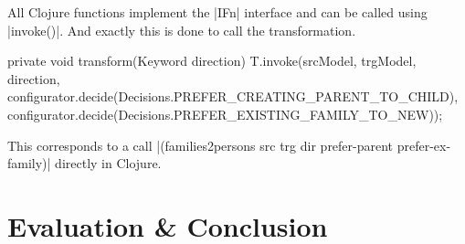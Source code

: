 \documentclass[a4paper]{article}
\newcommand{\code}{\clojureinline}
\begin{document}
All Clojure functions implement the \code|IFn| interface and can be called
using \code|invoke()|.  And exactly this is done to call the transformation.

\begin{javacode}
    private void transform(Keyword direction) {
        T.invoke(srcModel, trgModel, direction,
                configurator.decide(Decisions.PREFER_CREATING_PARENT_TO_CHILD),
                configurator.decide(Decisions.PREFER_EXISTING_FAMILY_TO_NEW));
    }
\end{javacode}

This corresponds to a call
\code|(families2persons src trg dir prefer-parent prefer-ex-family)| directly
in Clojure.

\section{Evaluation \& Conclusion}
\label{sec:evaluation}
\end{document}

